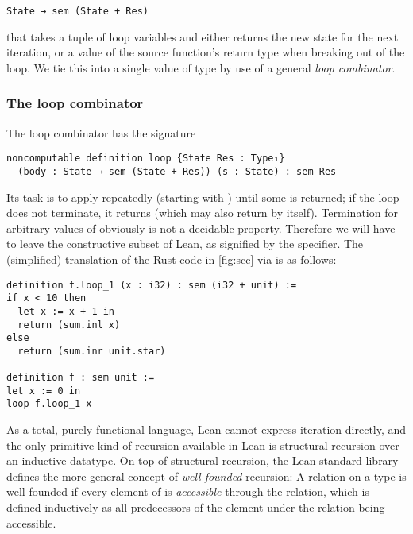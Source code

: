 \begin{verbatim}
State → sem (State + Res)
\end{verbatim}

\noindent{}that takes a tuple  of loop variables and either returns the new
state for the next iteration, or a value of the source function's return type
 when breaking out of the loop. We tie this into a single value of
type  by use of a general \emph{loop combinator}.

\subsubsection{The loop combinator}

The loop combinator has the signature

\begin{verbatim}
noncomputable definition loop {State Res : Type₁}
  (body : State → sem (State + Res)) (s : State) : sem Res
\end{verbatim}
Its task is to apply  repeatedly (starting with ) until some
 is returned; if the loop does not terminate, it returns 
(which  may also return by itself). Termination for arbitrary values
of  obviously is not a decidable property. Therefore we will have to leave
the constructive subset of Lean, as signified by the 
specifier. The (simplified) translation of the Rust code in \autoref{fig:scc} via
 is as follows:

\begin{verbatim}
definition f.loop_1 (x : i32) : sem (i32 + unit) :=
if x < 10 then
  let x := x + 1 in
  return (sum.inl x)
else
  return (sum.inr unit.star)

definition f : sem unit :=
let x := 0 in
loop f.loop_1 x
\end{verbatim}

As a total, purely functional language, Lean cannot express iteration directly,
and the only primitive kind of recursion available in Lean is structural recursion
over an inductive datatype. On top of structural recursion, the Lean standard
library defines the more general concept of \emph{well-founded} recursion: A
relation  on a type  is well-founded if every
element of  is \emph{accessible} through the relation, which is defined
inductively as all predecessors of the element under the relation being accessible.

